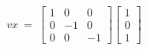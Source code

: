 \documentclass[preview]{standalone}
\begin{document}
\begin{align*}
vx\ =\ \begin{bmatrix}
                        1 & 0 & 0\\
                        0 & -1 & 0\\
                        0 & 0 & -1
                        \end{bmatrix}\begin{bmatrix}
                        1\\
                        0\\
                        1
                        \end{bmatrix}\\
\end{align*}
\end{document}
